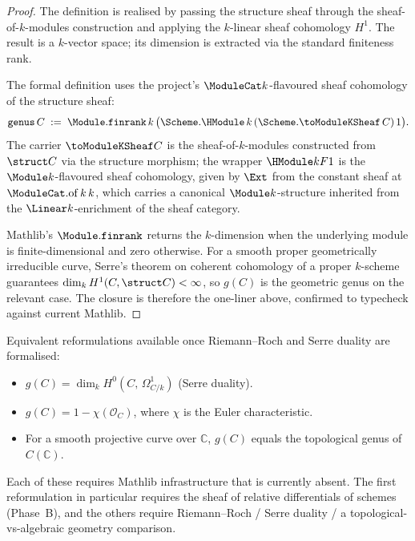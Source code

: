 \begin{proof}

  \leanok
  The definition is realised by passing the structure sheaf through the sheaf-of-\(k\)-modules construction and applying the \(k\)-linear sheaf cohomology \(H^1\). The result is a \(k\)-vector space; its dimension is extracted via the standard finiteness rank.

  \begin{remark}
    The formal definition uses the project's \(\ModuleCat k\)-flavoured sheaf cohomology of the structure sheaf:
    \[
      \mathtt{genus}\,C \;:=\; \Module.\mathtt{finrank}\,k\,\bigl(\Scheme.\HModule\,k\,(\Scheme.\toModuleKSheaf\,C)\,1\bigr).
    \]
    The carrier \(\toModuleKSheaf C\) is the sheaf-of-\(k\)-modules constructed from \(\struct C\) via the structure morphism; the wrapper \(\HModule k F 1\) is the \(\Module k\)-flavoured sheaf cohomology, given by \(\Ext\) from the constant sheaf at \(\ModuleCat.\mathrm{of}\,k\,k\), which carries a canonical \(\Module k\)-structure inherited from the \(\Linear k\)-enrichment of the sheaf category.
  \end{remark}

  Mathlib's \(\Module.\mathtt{finrank}\) returns the \(k\)-dimension when the underlying module is finite-dimensional and zero otherwise. For a smooth proper geometrically irreducible curve, Serre's theorem on coherent cohomology of a proper \(k\)-scheme guarantees \(\dim_k H^1(C, \struct C) < \infty\), so \(g(C)\) is the geometric genus on the relevant case. The closure is therefore the one-liner above, confirmed to typecheck against current Mathlib.
\end{proof}

Equivalent reformulations available once Riemann--Roch and Serre duality are formalised:
\begin{itemize}
  \item \(g(C) = \dim_k H^0(C,\, \Omega^1_{C/k})\) (Serre duality).
  \item \(g(C) = 1 - \chi(\mathcal O_C)\), where \(\chi\) is the Euler characteristic.
  \item For a smooth projective curve over \(\mathbb C\), \(g(C)\) equals the topological genus of \(C(\mathbb C)\).
\end{itemize}
Each of these requires Mathlib infrastructure that is currently absent. The first reformulation in particular requires the sheaf of relative differentials of schemes (Phase~B), and the others require Riemann--Roch / Serre duality / a topological-vs-algebraic geometry comparison.

